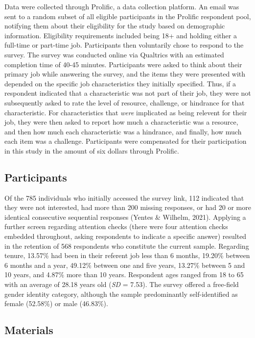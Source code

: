 \documentclass[
  english,
  man]{apa6}
\begin{document}
Data were collected through Prolific, a data collection platform. An email was sent to a random subset of all eligible participants in the Prolific respondent pool, notifying them about their eligibility for the study based on demographic information. Eligibility requirements included being 18+ and holding either a full-time or part-time job. Participants then voluntarily chose to respond to the survey. The survey was conducted online via Qualtrics with an estimated completion time of 40-45 minutes. Participants were asked to think about their primary job while answering the survey, and the items they were presented with depended on the specific job characteristics they initially specified. Thus, if a respondent indicated that a characteristic was not part of their job, they were not subsequently asked to rate the level of resource, challenge, or hindrance for that characteristic. For characteristics that \emph{were} implicated as being relevent for their job, they were then asked to report how much a characteristic was a resource, and then how much each characteristic was a hindrance, and finally, how much each item was a challenge. Participants were compensated for their participation in this study in the amount of six dollars through Prolific.

\hypertarget{participants}{%
\subsection{Participants}\label{participants}}

Of the 785 individuals who initially accessed the survey link, 112 indicated that they were not interested, had more than 200 missing responses, or had 20 or more identical consecutive sequential responses (Yentes \& Wilhelm, 2021). Applying a further screen regarding attention checks (there were four attention checks embedded throughout, asking respondents to indicate a specific answer) resulted in the retention of 568 respondents who constitute the current sample. Regarding tenure, 13.57\% had been in their referent job less than 6 months, 19.20\% between 6 months and a year, 49.12\% between one and five years, 13.27\% between 5 and 10 years, and 4.87\% more than 10 years. Respondent ages ranged from 18 to 65 with an average of 28.18 years old (\emph{SD} = 7.53). The survey offered a free-field gender identity category, although the sample predominantly self-identified as female (52.58\%) or male (46.83\%).

\hypertarget{materials}{%
\subsection{Materials}\label{materials}}
\end{document}
